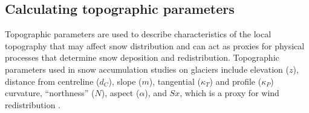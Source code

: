\documentclass[12pt]{article}
\begin{document}
\begin{figure}
  \label{fig:finalDEM}
\end{figure}

\subsection{Calculating topographic parameters}
\label{sec:topoCalc}

Topographic parameters are used to describe characteristics of the local topography that may affect snow distribution and can act as proxies for physical processes that determine snow deposition and redistribution. Topographic parameters used in snow accumulation studies on glaciers include elevation ($z$), distance from centreline ($d_C$), slope ($m$), tangential ($\kappa_T$) and profile ($\kappa_P$) curvature, ``northness'' ($N$), aspect ($\alpha$), and $Sx$, which is a proxy for wind redistribution \citep{Basist1994, Revuelto2014, McGrath2015}.	
 
\end{document}
